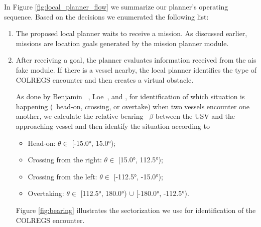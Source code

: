             In Figure \ref{fig:local_planner_flow} we summarize our planner's operating sequence. Based on the decisions we enumerated the following list: 
            
            \begin{enumerate}
            
                \item The proposed local planner waits to receive a mission. As discussed earlier, missions are location goals generated by the mission planner module.
                
                \item After receiving a goal, the planner evaluates information received from the ais fake module. If there is a vessel nearby, the local planner identifies the type of \ac{COLREGS} encounter and then creates a virtual obstacle. 
                
                As done by Benjamin \etal~\cite{Benjamin2006Method}, Loe~\cite{Loe2007Collision}, and \cite{Xu2017Deep}, for identification of which situation is happening (\ie~head-on, crossing, or overtake) when two vessels encounter one another, we calculate the relative bearing~\cite{He2017} $\beta$ between the \ac{USV} and the approaching vessel and then identify the situation according to 
            
                \begin{itemize}
                    \item Head-on: $\theta \in$ [-15.0°, 15.0°);
                    \item Crossing from the right: $\theta \in$ [15.0°, 112.5°);
                    \item Crossing from the left: $\theta \in$ [-112.5°, -15.0°);
                    \item Overtaking: $\theta \in$ [112.5°, 180.0°) $\cup$ [-180.0°, -112.5°).
                \end{itemize}
                
                Figure \ref{fig:bearing} illustrates the sectorization we use for identification of the \ac{COLREGS} encounter.
                

\end{enumerate}
